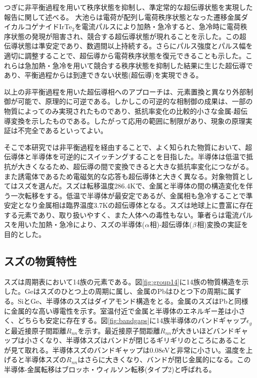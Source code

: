 つぎに非平衡過程を用いて秩序状態を抑制し、準定常的な超伝導状態を実現した報告に関して述べる。
大池らは電荷が配列し電荷秩序状態となった遷移金属ダイカルコゲナイドIrTe$_2$を電流パルスにより加熱・急冷すると、急冷時に電荷秩序状態の発現が阻害され、競合する超伝導状態が現れることを示した\cite{Oike}。この超伝導状態は準安定であり、数週間以上持続する。さらにパルス強度とパルス幅を適切に調整することで、超伝導から電荷秩序状態を復元できることも示した。これらは急加熱・急冷を用いて競合する秩序状態を抑制した結果に生じた超伝導であり、平衡過程からは到達できない状態(超伝導)を実現できる。

以上の非平衡過程を用いた超伝導相へのアプローチは、元素置換と異なり外部制御が可能で、原理的に可逆である。しかしこの可逆的な相制御の成果は、一部の物質によってのみ実現されたものであり、抵抗率変化の比較的小さな金属-超伝導変換を示したものである。したがって応用の範囲に制限があり、現象の原理実証は不完全であるといってよい。

そこで本研究では非平衡過程を経由することで、よく知られた物質において、超伝導体と半導体を可逆的にスイッチングすることを目指した。半導体は低温で抵抗が大きくなるため、超伝導の間で変換できると大きな抵抗率変化につながる。また誘電体であるため電磁気的な応答も超伝導体と大きく異なる。対象物質としてはスズを選んだ。スズは転移温度286.4Kで、金属と半導体の間の構造変化を伴う一次転移をする。低温で半導体が最安定であるが、金属相も急冷することで準安定となり金属相は臨界温度3.7Kの超伝導体となる。スズは地球上に豊富に存在する元素であり、取り扱いやすく、また人体への毒性もない。筆者らは電流パルスを用いた加熱・急冷により、スズの半導体($\rm \alpha$相)-超伝導体($\rm \beta$相)変換の実証を目的とした。

\subsection{スズの物質特性}
スズは周期表において14族の元素である。図\ref{fig:group14}に14族の物質構造を示した。Geはスズのひとつ上の周期に属し、金属のPbはひとつ下の周期に属する。SiとGe、半導体のスズはダイアモンド構造をとる。金属のスズはPbと同様に金属的な高い導電性を示す。室温付近で金属と半導体のエネルギー差は小さく、どちらも安定に存在する。図\ref{fig:bandgaps}に14族半導体のバンドギャップ$\epsilon_g$と最近接原子間距離$R_{nn}$を示す\cite{Yonezawa}。最近接原子間距離$R_{nn}$が大きいほどバンドギャップは小さくなり、半導体スズはバンドが閉じるギリギリのところにあることが見て取れる。半導体スズのバンドギャップは0.08eVと非常に小さい。温度を上げると半導体スズの$R_{nn}$はさらに大きくなり、バンドが閉じ金属的になる。この半導体-金属転移はブロッホ・ウィルソン転移(タイプ2)と呼ばれる\cite{Yonezawa}。

